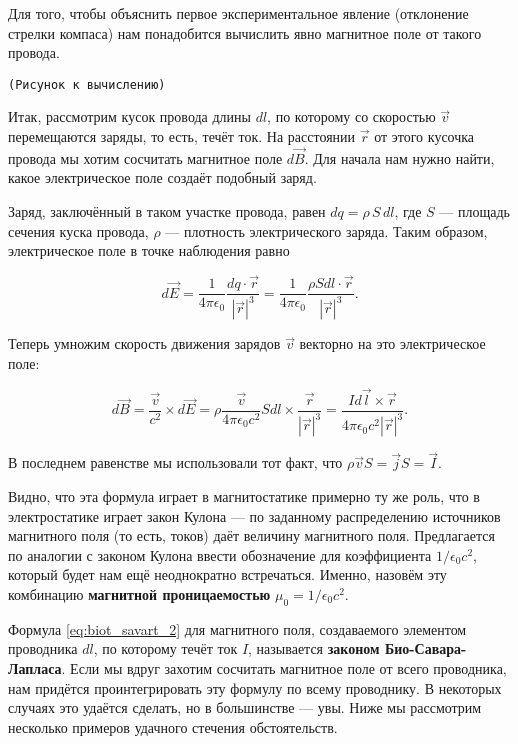\documentclass[a4paper,12pt]{article}
\numberwithin{equation}{section}
\newcommand{\eps}{\epsilon}
\newcommand{\com}[1]{{\Large{\texttt{{\color{red}(#1)}}}}}
\begin{document}
Для того, чтобы объяснить первое экспериментальное явление (отклонение
стрелки компаса) нам понадобится вычислить явно магнитное поле от
такого провода. 

\com{Рисунок к вычислению}

Итак, рассмотрим кусок провода длины $dl$, по которому со скоростью
$\vec{v}$ перемещаются заряды, то есть, течёт ток. На расстоянии
$\vec{r}$ от этого кусочка провода мы хотим сосчитать магнитное поле
$d\vec{B}$. Для начала нам нужно найти, какое электрическое поле
создаёт подобный заряд.

Заряд, заключённый в таком участке провода, равен $dq = \rho\, S\,
dl$, где $S$ — площадь сечения куска провода, $\rho$ — плотность
электрического заряда. Таким образом, электрическое поле в точке
наблюдения равно 

\begin{equation}
  \label{eq:biot_savart_1}
  d\vec{E} = \frac{1}{4\pi\eps_0} \frac{dq \cdot \vec{r}}{|\vec{r}|^3}
  = \frac{1}{4\pi\eps_0} \frac{\rho S dl
    \cdot \vec{r}}{|\vec{r}|^3}.
\end{equation}

Теперь умножим скорость движения зарядов $\vec{v}$ векторно на это
электрическое поле: 

\begin{equation}
  \label{eq:biot_savart_2}
  d\vec{B} = \frac{\vec{v}}{c^2}  \times d\vec{E} = \rho \frac{\vec{v}}{4\pi\eps_0c^2} S dl \times
  \frac{\vec{r}}{|\vec{r}|^3} = \frac{I d\vec{l} \times \vec{r}}{4\pi\eps_0c^2|\vec{r}|^3}.
\end{equation}

В последнем равенстве мы использовали тот факт, что $\rho \vec{v} S =
\vec{j} S = \vec{I}$. 

Видно, что эта формула играет в магнитостатике примерно ту же роль,
что в электростатике играет закон Кулона --- по заданному
распределению источников магнитного поля (то есть, токов) даёт
величину магнитного поля. Предлагается по аналогии с законом Кулона
ввести обозначение для коэффициента $1/\eps_0c^2$, который будет нам
ещё неоднократно встречаться. Именно, назовём эту комбинацию
\textbf{магнитной проницаемостью} $\mu_0 = 1/\eps_0c^2$. 


Формула \eqref{eq:biot_savart_2} для магнитного поля, создаваемого
элементом проводника $dl$, по которому течёт ток $I$, называется
\textbf{законом Био-Савара-Лапласа}. Если мы вдруг захотим сосчитать
магнитное поле от всего проводника, нам придётся проинтегрировать эту
формулу по всему проводнику. В некоторых случаях это удаётся сделать,
но в большинстве — увы. Ниже мы рассмотрим несколько примеров удачного
стечения обстоятельств. 
\end{document}
